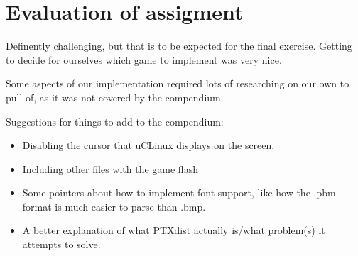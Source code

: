 \chapter{Evaluation of assigment}

Definently challenging, but that is to be expected for the final exercise.
Getting to decide for ourselves which game to implement was very nice.

Some aspects of our implementation required lots of researching on our own to pull of, as it was not covered by the compendium.

\vspace{1em}

Suggestions for things to add to the compendium:
\begin{itemize}
    \item   Disabling the cursor that uCLinux displays on the screen.
    \item   Including other files with the game flash
    \item   Some pointers about how to implement font support, like how the .pbm format is much easier to parse than .bmp.
    \item   A better explanation of what PTXdist actually is/what problem(s) it attempts to solve.
\end{itemize}
